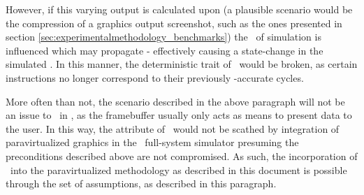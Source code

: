 However, if this varying output is calculated upon (a plausible scenario would be the compression of a graphics output screenshot, such as the ones presented in section \ref{sec:experimentalmethodology_benchmarks}) the \dvttermtiming\ of simulation is influenced which may propagate - effectively causing a state-change in the simulated \dvttermcpu .
In this manner, the deterministic trait of \dvttermsimics\ would be broken, as certain instructions no longer correspond to their previously \dvttermtiming -accurate cycles.

More often than not, the scenario described in the above paragraph will not be an issue to \dvttermdeterministicexecution\ in \dvttermsimics , as the framebuffer usually only acts as means to present data to the user.
In this way, the attribute of \dvttermdeterministicexecution\ would not be scathed by integration of paravirtualized graphics in the \dvttermsimics\ full-system simulator presuming the preconditions described above are not compromised.
As such, the incorporation of \dvttermdeterministicexecution\ into the paravirtualized methodology as described in this document is possible through the set of assumptions, as described in this paragraph.

